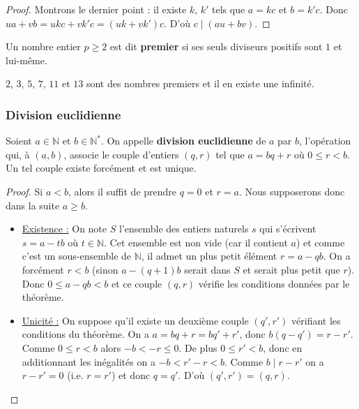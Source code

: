   \begin{proof}
    Montrons le dernier point : il existe $k$, $k'$ tels que $a = kc$ et $b = k'c$. Donc $ua + vb = ukc + vk'c = (uk + vk')c$. D'où $c \mid (au + bv)$.
  \end{proof}

  \begin{definition}
    Un nombre entier $p \geq 2$ est dit \textbf{premier} si ses seuls diviseurs positifs sont $1$ et lui-même.
  \end{definition}

  \begin{example}
    $2$, $3$, $5$, $7$, $11$ et $13$ sont des nombres premiers et il en existe une infinité.
  \end{example}

  \subsubsection{Division euclidienne}

  \begin{theorem}
    Soient $a \in \mathbb{N}$ et $b \in \mathbb{N}^*$. On appelle \textbf{division euclidienne} de $a$ par $b$, l'opération qui, à $(a, b)$, associe le couple d'entiers $(q, r)$ tel que $a = bq + r$ où $0 \leq r < b$. Un tel couple existe forcément et est unique.
  \end{theorem}

  \begin{proof}
    Si $a < b$, alors il suffit de prendre $q = 0$ et $r = a$. Nous supposerons donc dans la suite $a \geq b$.
    \begin{itemize}
      \item \uline{Existence :} On note $S$ l'ensemble des entiers naturels $s$ qui s'écrivent $s = a - tb$ où $t \in \mathbb{N}$. Cet ensemble est non vide (car il contient $a$) et comme c'est un sous-ensemble de $\mathbb{N}$, il admet un plus petit élément $r = a - qb$. On a forcément $r < b$ (sinon $a-(q+1)b$ serait dans $S$ et serait plus petit que $r$). Donc $0 \leq a - qb < b$ et ce couple $(q, r)$ vérifie les conditions données par le théorème.
      \item \uline{Unicité :} On suppose qu'il existe un deuxième couple $(q', r')$ vérifiant les conditions du théorème. On a $a = bq + r = bq' + r'$, donc $b(q-q') = r-r'$. Comme $0 \leq r < b$ alors $-b < -r \leq 0$. De plus $0 \leq r' < b$, donc en additionnant les inégalités on a $-b < r' - r < b$. Comme $b \mid r - r'$ on a $r - r' = 0$ (i.e. $r = r'$) et donc $q = q'$. D'où $(q', r') = (q, r)$.
    \end{itemize}
  \end{proof}

